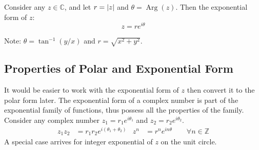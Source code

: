 \documentclass[12pt, english]{book}
\begin{document}
	\begin{definition}
	Consider any $z \in \mathbb{C}$, and let $r = \abs{z}$ and $\theta = \operatorname{Arg}(z)$. Then the exponential form of $z$:
		$$z = r e^{i \theta}$$
		\label{Exponential Form of z - Complex}
	\end{definition}
	Note: $\theta = \tan^{-1}(y/x)$ and $r = \sqrt{x^2 + y^2}$.
	\begin{center}
	\end{center}
	
	\subsection{Properties of Polar and Exponential Form} \label{Properties of Polar and Exponential Form Subsection - Complex}
	It would be easier to work with the exponential form of $z$ then convert it to the polar form later. The exponential form of a complex number is part of the exponential family of functions, thus possess all the properties of the family. Consider any complex number $z_1 = r_1 e^{i\theta_1}$ and $z_2 = r_2 e^{i\theta_2}$.
	\begin{align*}
		z_1  z_2 &= r_1 r_2 e^{i(\theta_1 + \theta_2)} 
			& z^n &= r^n e^{i n \theta} \qquad \forall n \in \mathbb{Z}
	\end{align*}
	A special case arrives for integer exponential of $z$ on the unit circle.
	
\end{document}
